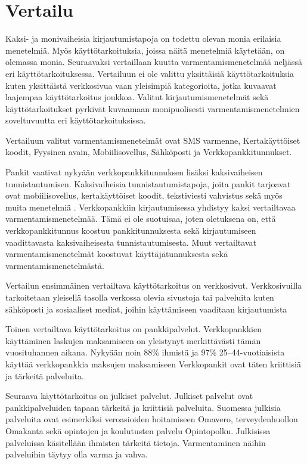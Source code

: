 \chapter{Vertailu\label{vertailu}}

Kaksi- ja monivaiheisia kirjautumistapoja on todettu olevan monia erilaisia menetelmiä. Myös käyttötarkoituksia, joissa näitä menetelmiä käytetään, on olemassa monia. Seuraavaksi vertaillaan kuutta varmentamismenetelmää neljässä eri käyttötarkoituksessa. Vertailuun ei ole valittu yksittäisiä käyttötarkoituksia kuten yksittäistä verkkosivua vaan yleisimpiä kategorioita, jotka kuvaavat laajempaa käyttötarkoitus joukkoa. Valitut kirjautumismenetelmät sekä käyttötarkoitukset pyrkivät kuvaamaan monipuolisesti varmentamismenetelmien soveltuvuutta eri käyttötarkoituksissa. 

Vertailuun valitut varmentamismenetelmät ovat SMS varmenne, Kertakäyttöiset koodit, Fyysinen avain, Mobiilisovellus, Sähköposti ja Verkkopankkitunnukset.

Pankit vaativat nykyään verkkopankkitunnuksen lisäksi kaksivaiheisen tunnistautumisen. Kaksivaiheisia tunnistautumistapoja, joita pankit tarjoavat ovat mobiilisovellus, kertakäyttöiset koodit, tekstiviesti vahvistus sekä myös muita menetelmiä \citep{nordea_tunnistautuminen} \citep{op_tunnistautuminen} \citep{spankki_tunnistautuminen}. Verkkopankkiin kirjautumisessa yhdistyy kaksi vertailtavaa varmentamismenetelmää. Tämä ei ole suotuisaa, joten oletuksena on, että verkkopankkitunnus koostuu pankkitunnuksesta sekä kirjautumiseen vaadittavasta kaksivaiheisesta tunnistautumisesta. Muut vertailtavat varmentamismenetelmät koostuvat käyttäjätunnuksesta sekä varmentamismenetelmästä. 


Vertailun ensimmäinen vertailtava käyttötarkoitus on verkkosivut. Verkkosivuilla tarkoitetaan yleisellä tasolla verkossa olevia sivustoja tai palveluita kuten sähköposti ja sosiaaliset mediat, joihin käyttämiseen vaaditaan kirjautumista

Toinen vertailtava käyttötarkoitus on pankkipalvelut. Verkkopankkien käyttäminen laskujen maksamiseen on yleistynyt merkittävästi tämän vuosituhannen aikana. Nykyään noin 88\% ihmistä ja 97\% 25–44-vuotiaisista  käyttää verkkopankkia maksujen maksamiseen \citep{säästäminen_luotonkäyttö_maksutavat} Verkkopankit ovat täten kriittisiä ja tärkeitä palveluita.

Seuraava käyttötarkoitus on julkiset palvelut. Julkiset palvelut ovat pankkipalveluiden tapaan tärkeitä ja kriittisiä palveluita. Suomessa julkisia palveluita ovat esimerkiksi veroasioiden hoitamiseen Omavero, terveydenhuollon Omakanta sekä opintojen ja koulutusten palvelu Opintopolku. Julkisissa palveluissa käsitellään ihmisten tärkeitä tietoja. Varmentaminen näihin palveluihin täytyy olla varma ja vahva.

